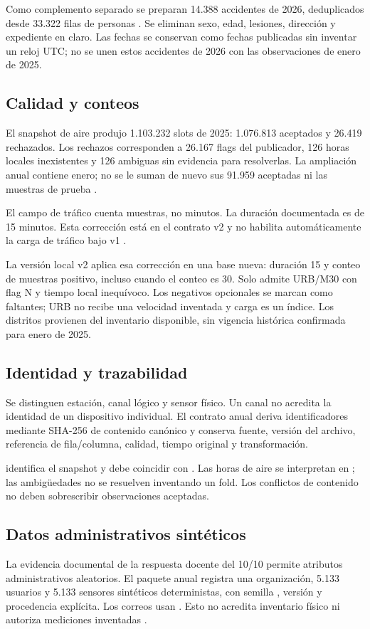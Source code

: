 Como complemento separado se preparan 14.388 accidentes de 2026,
deduplicados desde 33.322 filas de personas \cite{accidentes}.
Se eliminan sexo, edad, lesiones, dirección y expediente en claro. Las fechas
se conservan como fechas publicadas sin inventar un reloj UTC; no se unen
estos accidentes de 2026 con las observaciones de enero de 2025.

\subsection{Calidad y conteos}
El snapshot de aire produjo 1.103.232 slots de 2025: 1.076.813 aceptados y
26.419 rechazados. Los rechazos corresponden a 26.167 flags del publicador,
126 horas locales inexistentes y 126 ambiguas sin evidencia para resolverlas.
La ampliación anual contiene enero; no se le suman de nuevo sus 91.959 aceptadas
ni las muestras de prueba \cite{cierre}.

El campo de tráfico  cuenta muestras, no minutos.
La duración documentada es de 15 minutos. Esta corrección está en el contrato
v2 y no habilita automáticamente la carga de tráfico bajo v1 \cite{v2}.

La versión local v2 aplica esa corrección en una base nueva: duración 15 y
conteo de muestras positivo, incluso cuando el conteo es 30. Solo admite URB/M30
con flag N y tiempo local inequívoco. Los negativos opcionales se marcan como
faltantes; URB no recibe una velocidad inventada y carga es un índice.
Los distritos provienen del inventario disponible, sin vigencia histórica
confirmada para enero de 2025.

\subsection{Identidad y trazabilidad}
Se distinguen estación, canal lógico y sensor físico. Un canal no acredita la
identidad de un dispositivo individual. El contrato anual deriva identificadores
mediante SHA-256 de contenido canónico y conserva fuente, versión del archivo,
referencia de fila/columna, calidad, tiempo original y transformación.

 identifica el snapshot y debe coincidir con
. Las horas de aire se interpretan en
; las ambigüedades no se resuelven inventando un fold.
Los conflictos de contenido no deben sobrescribir observaciones aceptadas.

\subsection{Datos administrativos sintéticos}
La evidencia documental de la respuesta docente del 10/10 permite atributos
administrativos aleatorios. El paquete anual registra una organización,
5.133 usuarios y 5.133 sensores sintéticos deterministas, con semilla
, versión  y procedencia explícita.
Los correos usan . Esto no acredita inventario físico
ni autoriza mediciones inventadas \cite{permiso,contrato}.


